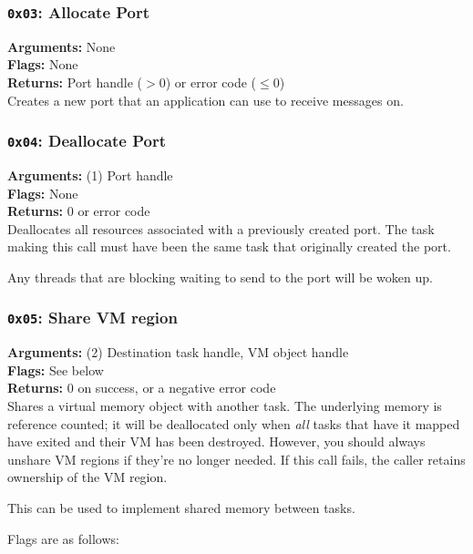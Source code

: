 \documentclass[11pt]{article}
\begin{document}
\subsubsection{{\tt 0x03}: Allocate Port}
\textbf{Arguments:} None \\
\textbf{Flags:} None \\
\textbf{Returns:} Port handle ($>0$) or error code ($\leq0$) \\

Creates a new port that an application can use to receive messages on.

\subsubsection{{\tt 0x04}: Deallocate Port}
\textbf{Arguments:} (1) Port handle \\
\textbf{Flags:} None \\
\textbf{Returns:} 0 or error code \\

Deallocates all resources associated with a previously created port. The task making this call must have been the same task that originally created the port.

Any threads that are blocking waiting to send to the port will be woken up.

\subsubsection{{\tt 0x05}: Share VM region}
\textbf{Arguments:} (2) Destination task handle, VM object handle \\
\textbf{Flags:} See below \\
\textbf{Returns:} 0 on success, or a negative error code \\

Shares a virtual memory object with another task. The underlying memory is reference counted; it will be deallocated only when \textit{all} tasks that have it mapped have exited and their VM has been destroyed. However, you should always unshare VM regions if they're no longer needed. If this call fails, the caller retains ownership of the VM region.

This can be used to implement shared memory between tasks.

Flags are as follows:
\end{document}
